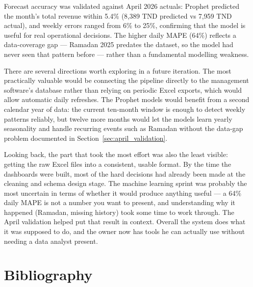 \documentclass[12pt, a4paper]{report}
\begin{document}
Forecast accuracy was validated against April 2026 actuals: Prophet predicted the
month's total revenue within 5.4\% (8{,}389 TND predicted vs 7{,}959 TND actual),
and weekly errors ranged from 6\% to 25\%, confirming that the model is useful for
real operational decisions. The higher daily MAPE (64\%) reflects a data-coverage
gap --- Ramadan 2025 predates the dataset, so the model had never seen that pattern
before --- rather than a fundamental modelling weakness.

There are several directions worth exploring in a future iteration. The most
practically valuable would be connecting the pipeline directly to the management
software's database rather than relying on periodic Excel exports, which would allow
automatic daily refreshes. The Prophet models would benefit from a second calendar
year of data: the current ten-month window is enough to detect weekly patterns
reliably, but twelve more months would let the models learn yearly seasonality and
handle recurring events such as Ramadan without the data-gap problem documented in
Section~\ref{sec:april_validation}.

Looking back, the part that took the most effort was also the least visible:
getting the raw Excel files into a consistent, usable format. By the time the
dashboards were built, most of the hard decisions had already been made at the
cleaning and schema design stage. The machine learning sprint was probably
the most uncertain in terms of whether it would produce anything useful ---
a 64\% daily MAPE is not a number you want to present, and understanding why
it happened (Ramadan, missing history) took some time to work through. The April
validation helped put that result in context. Overall the system does what it was
supposed to do, and the owner now has tools he can actually use without needing
a data analyst present.

\chapter*{Bibliography}
\end{document}
